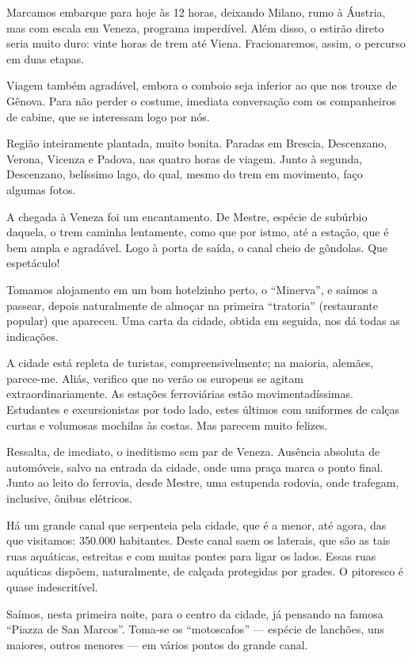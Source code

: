 Marcamos embarque para hoje às 12 horas, deixando Milano, rumo à Áustria, mas com escala em Veneza, programa imperdível. Além disso, o estirão direto seria muito duro: vinte horas de trem até Viena. Fracionaremos, assim, o percurso em duas etapas.

Viagem também agradável, embora o comboio seja inferior ao que nos trouxe de Gênova. Para não perder o costume, imediata conversação com os companheiros de cabine, que se interessam logo por nós.

Região inteiramente plantada, muito bonita. Paradas em Brescia, Descenzano, Verona, Vicenza e Padova, nas quatro horas de viagem. Junto à segunda, Descenzano, belíssimo lago, do qual, mesmo do trem em movimento, faço algumas fotos.

A chegada à Veneza foi um encantamento. De Mestre, espécie de subúrbio daquela, o trem caminha lentamente, como que por istmo, até a estação, que é bem ampla e agradável. Logo à porta de saída, o canal cheio de gôndolas. Que espetáculo!

Tomamos alojamento em um bom hotelzinho perto, o ``Minerva'', e saímos a passear, depois naturalmente de almoçar na primeira ``tratoria'' (restaurante popular) que apareceu. Uma carta da cidade, obtida em seguida, nos dá todas as indicações.

A cidade está repleta de turistas, compreensivelmente; na maioria, alemães, parece-me. Aliás, verifico que no verão os europeus se agitam extraordinariamente. As estações ferroviárias estão movimentadíssimas. Estudantes e excursionistas por todo lado, estes últimos com uniformes de calças curtas e volumosas mochilas às costas. Mas parecem muito felizes.

Ressalta, de imediato, o ineditismo sem par de Veneza. Ausência absoluta de automóveis, salvo na entrada da cidade, onde uma praça marca o ponto final. Junto ao leito do ferrovia, desde Mestre, uma estupenda rodovia, onde trafegam, inclusive, ônibus elétricos.

Há um grande canal que serpenteia pela cidade, que é a menor, até agora, das que visitamos: 350.000 habitantes. Deste canal saem os laterais, que são as tais ruas aquáticas, estreitas e com muitas pontes para ligar os lados. Essas ruas aquáticas dispõem, naturalmente, de calçada protegidas por grades. O pitoresco é quase indescritível.

Saímos, nesta primeira noite, para o centro da cidade, já pensando na famosa ``Piazza de San Marcos''. Toma-se os ``motoscafos'' --- espécie de lanchões, uns maiores, outros menores --- em vários pontos do grande canal.

